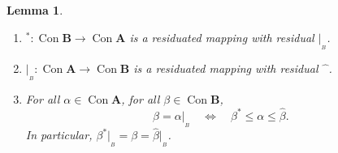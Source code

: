 \documentclass{au}
\numberwithin{equation}{section}
\theoremstyle{plain}
\newtheorem{lemma}[theorem]{Lemma}
\theoremstyle{definition}
\newcommand{\<}{\ensuremath{\langle}}
\renewcommand{\>}{\ensuremath{\rangle}}
\newcommand{\bA}{\ensuremath{\mathbf{A}}}
\newcommand{\bB}{\ensuremath{\mathbf{B}}}
\DeclareMathOperator{\Con}{Con}
\renewcommand{\leq}{\ensuremath{\leqslant}}
\newcommand{\resB}{\ensuremath{|_{_B}}}
\newcommand{\hatmap}{\ensuremath{\widehat{\phantom{x}}}} %
\begin{document}
\begin{lemma}\ %
\begin{enumerate}[\rm(i)] %
  \item \label{item:residlemma-i} $^*\colon \Con\bB \rightarrow \Con\bA$ is a residuated mapping with
    residual $\resB$.
  \item \label{item:residlemma-ii} $\resB \colon  \Con\bA \rightarrow \Con\bB$ is a residuated mapping with
    residual $\hatmap$.
\item \label{item:residlemma-iii} For all $\alpha \in \Con\bA$, for all $\beta \in \Con\bB$,
\[
\beta = \alpha\resB \quad \Longleftrightarrow  \quad
\beta^* \leq \alpha \leq \widehat{\beta}.
\]
In particular,
$\beta^*\resB = \beta = \widehat{\beta}\resB$.
  \end{enumerate}
\end{lemma}
\end{document}
